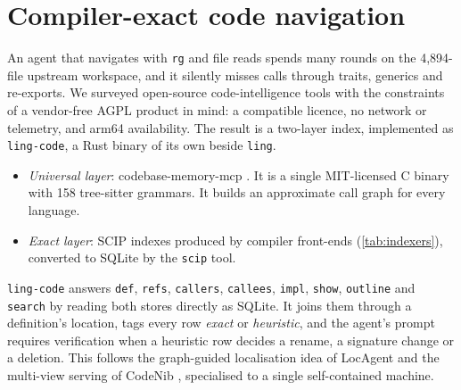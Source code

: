 \documentclass[11pt]{article}
\newcommand{\code}[1]{\texttt{#1}}
\begin{document}
\section{Compiler-exact code navigation}
\label{sec:index}

An agent that navigates with \code{rg} and file reads spends many rounds on the 4{,}894-file
upstream workspace, and it silently misses calls through traits, generics and re-exports. We
surveyed open-source code-intelligence tools with the constraints of a vendor-free AGPL product in
mind: a compatible licence, no network or telemetry, and arm64 availability. The result is a
two-layer index, implemented as \code{ling-code}, a Rust binary of its own beside \code{ling}.
\begin{itemize}
  \item \emph{Universal layer}: codebase-memory-mcp \cite{codebasememorymcp,vogel2026codebasememory}.
    It is a single MIT-licensed C binary with 158 tree-sitter \cite{treesitter} grammars. It builds
    an approximate call graph for every language.
  \item \emph{Exact layer}: SCIP \cite{scip} indexes produced by compiler front-ends
    (\cref{tab:indexers}), converted to SQLite by the \code{scip} tool.
\end{itemize}
\code{ling-code} answers \code{def}, \code{refs}, \code{callers}, \code{callees}, \code{impl},
\code{show}, \code{outline} and \code{search} by reading both stores directly as SQLite. It joins
them through a definition's location, tags every row \emph{exact} or \emph{heuristic}, and the
agent's prompt requires verification when a heuristic row decides a rename, a signature change
or a deletion. This follows the graph-guided localisation idea of LocAgent
\cite{chen2025locagent} and the multi-view serving of CodeNib \cite{yu2026codenib}, specialised to
a single self-contained machine.
\end{document}
